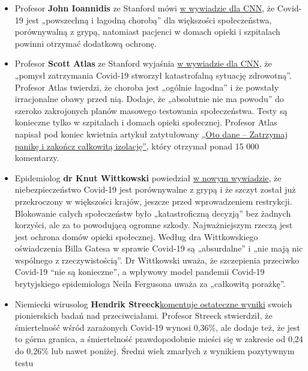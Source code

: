 \begin{itemize}
\tightlist
\item
  Profesor \textbf{John Ioannidis} ze Stanford mówi
  \href{https://twitter.com/cnn/status/1256579248342564865}{w wywiadzie
  dla CNN}, że Covid-19 jest „powszechną i łagodną chorobą'' dla
  większości społeczeństwa, porównywalną z grypą, natomiast pacjenci w
  domach opieki i szpitalach powinni otrzymać dodatkową ochronę.
\item
  Profesor \textbf{Scott Atlas} ze Stanford wyjaśnia
  \href{https://www.facebook.com/cnn/posts/10160799274796509}{w
  wywiadzie dla CNN}, że „pomysł zatrzymania Covid-19 stworzył
  katastrofalną sytuację zdrowotną''. Profesor Atlas twierdzi, że
  choroba jest „ogólnie łagodna'' i że powstały irracjonalne obawy przed
  nią. Dodaje, że „absolutnie nie ma powodu'' do szeroko zakrojonych
  planów masowego testowania społeczeństwa. Testy są konieczne tylko w
  szpitalach i domach opieki społecznej. Profesor Atlas napisał pod
  koniec kwietnia artykuł zatytułowany
  \href{https://thehill.com/opinion/healthcare/494034-the-data-are-in-stop-the-panic-and-end-the-total-isolation}{„Oto
  dane -- Zatrzymaj panikę i zakończ całkowitą izolację''}, który
  otrzymał ponad 15 000 komentarzy.
\item
  Epidemiolog \textbf{dr Knut Wittkowski} powiedział
  \href{https://www.thepressandthepublic.com/post/perspectives-on-the-pandemic-v}{w
  nowym wywiadzie}, że niebezpieczeństwo Covid-19 jest porównywalne z
  grypą i że szczyt został już przekroczony w większości krajów, jeszcze
  przed wprowadzeniem restrykcji. Blokowanie całych społeczeństw było
  „katastroficzną decyzją'' bez żadnych korzyści, ale za to powodującą
  ogromne szkody. Najważniejszym rzeczą jest jest ochrona domów opieki
  społecznej. Według dra Wittkowskiego oświadczenia Billa Gatesa w
  sprawie Covid-19 są „absurdalne'' i „nie mają nic wspólnego z
  rzeczywistością''. Dr Wittkowski uważa, że szczepienia przeciwko
  Covid-19 ``nie są konieczne'', a wpływowy model pandemii Covid-19
  brytyjskiego epidemiologa Neila Fergusona uważa za „całkowitą
  porażkę''.
\item
  Niemiecki wirusolog \textbf{Hendrik
  Streeck}\href{https://www.youtube.com/watch?v=vrL9QKGQrWk}{komentuje
  ostateczne wyniki} swoich pionierskich badań nad przeciwciałami.
  Profesor Streeck stwierdził, że śmiertelność wśród zarażonych Covid-19
  wynosi 0,36\%, ale dodaje też, że jest to górna granica, a
  śmiertelność prawdopodobnie mieści się w zakresie od 0,24 do 0,26\%
  lub nawet poniżej. Średni wiek zmarłych z wynikiem pozytywnym testu

\end{itemize}
